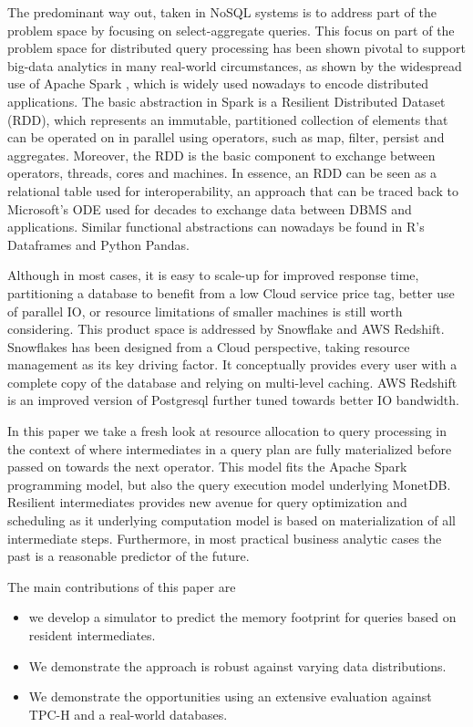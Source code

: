 \documentclass[conference]{IEEEtran}
\begin{document}
The predominant way out, taken in NoSQL systems  \cite{Casandra,Impala} is to address part of the problem space by focusing on select-aggregate queries. This focus on part of the problem space for distributed query processing has been shown pivotal to support big-data analytics in many real-world circumstances, as shown by the widespread use of Apache Spark \cite{}, which is widely used nowadays to encode distributed applications.
The basic abstraction in Spark is a Resilient Distributed Dataset (RDD), which represents an immutable, partitioned collection of elements that can be operated on in parallel using operators, such as map, filter, persist and aggregates. Moreover, the RDD is the basic component to exchange between operators, threads, cores and machines. In essence, an RDD can be seen as a relational table used for interoperability, an approach that can be traced back to Microsoft's ODE \cite{} used for decades to exchange data between DBMS and applications. Similar functional abstractions can nowadays be found in R's Dataframes and Python Pandas\cite{}.


Although in most cases, it is easy to scale-up for improved response time, partitioning a database to benefit from a low Cloud service price tag, better use of parallel IO, or resource limitations of smaller machines is still worth considering. This product space is addressed by Snowflake and AWS Redshift. Snowflakes has been designed from a Cloud perspective, taking
resource management as its key driving factor. It conceptually provides every user with a complete copy of the database and relying on multi-level caching. AWS Redshift is an improved
version of Postgresql further tuned towards better IO bandwidth.

In this paper we take a fresh look at resource allocation to query processing in the context of where intermediates in a query plan are fully materialized before passed on towards the next operator. This model fits the Apache Spark programming model, but also the query execution model underlying MonetDB. Resilient intermediates provides new avenue for query optimization and scheduling as it underlying computation model is based on materialization of all intermediate steps. Furthermore, in most practical business analytic cases the past is a reasonable predictor of the future.

The main contributions of this paper are
\begin{itemize}
	\item we develop a simulator to predict the memory footprint  for queries based on resident intermediates.
	\item We demonstrate the approach is robust against varying data distributions.
	\item We demonstrate the opportunities using an extensive evaluation against TPC-H and a real-world databases.
\end{itemize}
\end{document}
